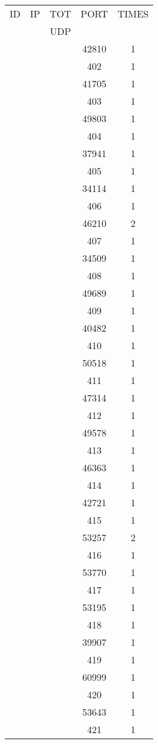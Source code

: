 \documentclass[a4paper]{scrartcl}
\begin{document}
\begin{minipage}[b]{0.5\linewidth}
\begin{tabular}{| c | c | c | c | c |}
\hline
ID & IP & TOT & PORT & TIMES \\ 
   &    & UDP &      &       \\ 
\hline
& & & 42810 & 1 \\ & & & 402 & 1 \\ & & & 41705 & 1 \\ & & & 403 & 1 \\ & & & 49803 & 1 \\ & & & 404 & 1 \\ & & & 37941 & 1 \\ & & & 405 & 1 \\ & & & 34114 & 1 \\ & & & 406 & 1 \\ & & & 46210 & 2 \\ & & & 407 & 1 \\ & & & 34509 & 1 \\ & & & 408 & 1 \\ & & & 49689 & 1 \\ & & & 409 & 1 \\ & & & 40482 & 1 \\ & & & 410 & 1 \\ & & & 50518 & 1 \\ & & & 411 & 1 \\ & & & 47314 & 1 \\ & & & 412 & 1 \\ & & & 49578 & 1 \\ & & & 413 & 1 \\ & & & 46363 & 1 \\ & & & 414 & 1 \\ & & & 42721 & 1 \\ & & & 415 & 1 \\ & & & 53257 & 2 \\ & & & 416 & 1 \\ & & & 53770 & 1 \\ & & & 417 & 1 \\ & & & 53195 & 1 \\ & & & 418 & 1 \\ & & & 39907 & 1 \\ & & & 419 & 1 \\ & & & 60999 & 1 \\ & & & 420 & 1 \\ & & & 53643 & 1 \\ & & & 421 & 1 \\ \hline\end{tabular}\end{minipage} \hfill\begin{minipage}[b]{0.5\linewidth}\begin{tabular}{| c | c | c | c | c |}

\end{tabular}
\end{minipage}
\end{document}
